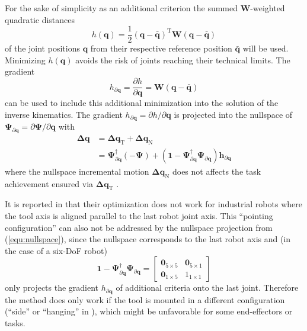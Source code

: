 \documentclass{svproc}
\newcommand{\bm}[1]{\boldsymbol{#1}}
\newcommand{\transp}[0]{{\mathrm{T}}}
\begin{document}
For the sake of simplicity as an additional criterion the summed $\bm{W}$-weighted quadratic distances
%
\begin{equation}
h(\bm{q})
=
\frac{1}{2} (\bm{q}-\bar{\bm{q}})^\transp\bm{W}(\bm{q}-\bar{\bm{q}})
\end{equation}  
%
of the joint positions $\bm{q}$ from their respective reference position $\bar{\bm{q}}$ will be used.
Minimizing $h(\bm{q})$ avoids the risk of joints reaching their technical limits.
The gradient
%
\begin{equation}
h_{\partial\bm{q}}
=
\frac{\partial h}{\partial \bm{q}}
=
\bm{W}(\bm{q}-\bar{\bm{q}})
\end{equation}
%
can be used to include this additional minimization into the solution of the inverse kinematics.
The gradient $h_{\partial\bm{q}}=\partial h/\partial \bm{q}$ is projected into the nullspace of $\bm{\Psi}_{\partial\bm{q}}=\partial \bm{\Psi}/\partial \bm{q}$ with
%
\begin{align}
\bm{\Delta}\bm{q}
&=
\bm{\Delta}\bm{q}_{\mathrm{T}} + \bm{\Delta}\bm{q}_{\mathrm{N}} \nonumber \\
&=
\bm{\Psi}_{\partial\bm{q}}^{\dagger} (-\bm{\Psi}) +  (\bm{1}-\bm{\Psi}_{\partial\bm{q}}^{\dagger}\bm{\Psi}_{\partial\bm{q}}) \bm{h}_{\partial\bm{q}}
\label{equ:nullspace}
\end{align}
%
where the nullspace incremental motion $\bm{\Delta}\bm{q}_{\mathrm{N}}$ does not affects the task achievement ensured via $\bm{\Delta}\bm{q}_{\mathrm{T}}$ \cite{Yoshikawa1984}.

It is reported in \cite{GuoDonKe2015} that their optimization does not work for industrial robots where the tool axis is aligned parallel to the last robot joint axis.
This ``pointing configuration'' can also not be addressed by the nullspace projection from (\ref{equ:nullspace}), since the nullspace corresponds to the last robot axis and (in the case of a six-DoF robot)
%
\begin{equation}
\bm{1}-\bm{\Psi}_{\partial\bm{q}}^{\dagger}\bm{\Psi}_{\partial\bm{q}}
=
\begin{bmatrix}
\bm{0}_{5 \times 5} & \bm{0}_{5 \times 1} \\
\bm{0}_{1 \times 5} & 1_{1 \times 1}
\end{bmatrix}
\end{equation}
%
only projects the gradient $h_{\partial\bm{q}}$ of additional criteria onto the last joint.
Therefore the method does only work if the tool is mounted in a different configuration (``side'' or ``hanging'' in \cite{GuoDonKe2015}), which might be unfavorable for some end-effectors or tasks.
\end{document}
